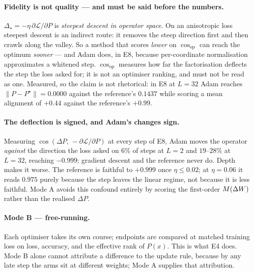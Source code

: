 \documentclass{article}
\newcommand{\NOTE}[1]{{\color{gray}\small #1}}
\theoremstyle{plain}\newtheorem{theorem}{Theorem}\newtheorem{lemma}[theorem]{Lemma}
\theoremstyle{definition}\newtheorem{definition}[theorem]{Definition}
\newcommand{\Dstar}{\Delta_\star}\newcommand{\Lam}{\Lambda}
\begin{document}
\paragraph{Fidelity is not quality --- and must be said before the numbers.}
$\Dstar=-\eta\,\partial\mathcal L/\partial P$ is \emph{steepest descent in operator space}. On an
anisotropic loss steepest descent is an indirect route: it removes the steep direction first and
then crawls along the valley. So a method that scores \emph{lower} on $\cos_{\mathrm{op}}$ can
reach the optimum \emph{sooner} --- and Adam does, in E8, because per-coordinate normalisation
approximates a whitened step. $\cos_{\mathrm{op}}$ measures how far the factorisation deflects the
step the loss asked for; it is not an optimiser ranking, and must not be read as one.
\NOTE{Measured, so the claim is not rhetorical: in E8 at $L{=}32$ Adam reaches
$\|P-P^\star\|=0.0000$ against the reference's $0.1437$ while scoring a mean alignment of $+0.44$
against the reference's $+0.99$.}

\paragraph{The deflection is signed, and Adam's changes sign.} Measuring
$\cos(\Delta P,\,-\partial\mathcal L/\partial P)$ at every step of E8, Adam moves the operator
\emph{against} the direction the loss asked on $6\%$ of steps at $L{=}2$ and $19$--$28\%$ at
$L{=}32$, reaching $-0.999$; gradient descent and the reference never do. Depth makes it worse.
\NOTE{The reference is faithful to $+0.999$ once $\eta\le0.02$; at $\eta=0.06$ it reads $0.975$
purely because the step leaves the linear regime, not because it is less faithful. Mode A avoids
this confound entirely by scoring the first-order $M(\Delta W)$ rather than the realised $\Delta P$.}

\paragraph{Mode B --- free-running.} Each optimiser takes its own course; endpoints are compared at
matched training loss on loss, accuracy, and the effective rank of $P(x)$. This is what E4 does.
Mode B alone cannot attribute a difference to the update rule, because by any late step the arms
sit at different weights; Mode A supplies that attribution.
\end{document}
